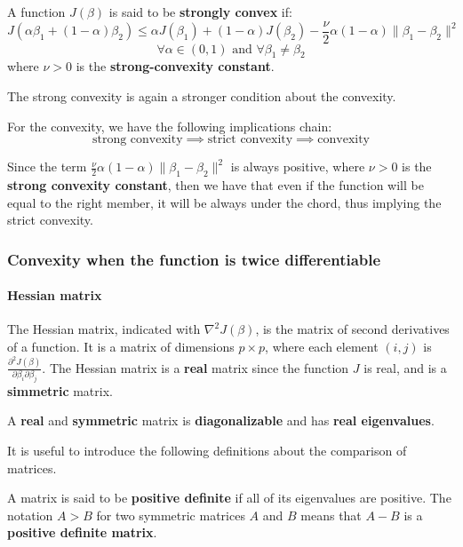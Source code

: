 \begin{definition}
    A function $J(\beta)$ is said to  be \textbf{strongly convex} if:
    \[
        J(\alpha \beta_1 + (1-\alpha)\beta_2) \leq \alpha J(\beta_1) + (1-\alpha)J(\beta_2) - \frac{\nu}{2} \alpha (1-\alpha) \| \beta_1 - \beta_2 \|^2
    \]
    \[
        \forall \alpha \in (0,1) \text{ and } \forall \beta_1 \neq \beta_2
    \]
    where $\nu >0 $ is the \textbf{strong-convexity constant}.
\end{definition}

The strong convexity is again a stronger condition about the convexity.

\begin{theorem}
    For the convexity, we have the following implications chain:
    \[
        \text{strong convexity} \implies \text{strict convexity} \implies \text{convexity}
    \]
\end{theorem}
Since the term $\frac{\nu}{2} \alpha (1-\alpha) \| \beta_1 - \beta_2 \|^2$ is always positive, where $\nu>0$ is the \textbf{strong convexity constant}, then we have that even if the function will be equal to the right member, it will be always under the chord, thus implying the strict convexity.

\subsubsection*{Convexity when the function is twice differentiable}
\paragraph*{Hessian matrix}
The Hessian matrix, indicated with $\nabla^2 J(\beta)$, is the matrix of second derivatives of a function. It is a matrix of dimensions $p \times p$, where each element $(i,j)$ is $\frac{\partial^2 J(\beta)}{\partial \beta_i \partial \beta_j}$.
The Hessian matrix is a \textbf{real} matrix since the function $J$ is real, and is a \textbf{simmetric} matrix.

\begin{theorem}
    A \textbf{real} and \textbf{symmetric} matrix is \textbf{diagonalizable} and has \textbf{real eigenvalues}.
\end{theorem}

It is useful to introduce the following definitions about the comparison of matrices.

\begin{definition}
    A matrix is said to be \textbf{positive definite} if all of its eigenvalues are positive. The notation $A > B$ for two symmetric matrices $A$ and $B$ means that $A-B$ is a \textbf{positive definite matrix}.
\end{definition}

